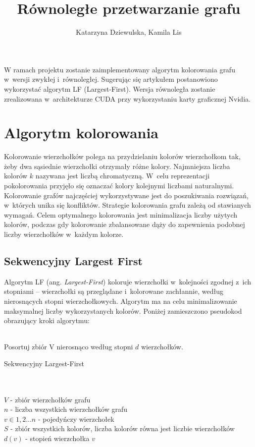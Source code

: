 \documentclass{article}
\date{}
\author{Katarzyna Dziewulska, Kamila Lis}
\title{Równoległe przetwarzanie grafu}
\begin{document}
	\maketitle
	W ramach projektu zostanie zaimplementowany algorytm kolorowania grafu w~wersji zwykłej i~równoległej. Sugerując się artykułem \cite{article} postanowiono wykorzystać algorytm LF (Largest-First). Wersja równoległa zostanie zrealizowana w~architekturze CUDA przy wykorzystaniu karty graficznej Nvidia.\\
	
	\section{Algorytm kolorowania}
	Kolorowanie wierzchołków polega na  przydzielaniu kolorów wierzchołkom tak, żeby dwa sąsiednie wierzchołki otrzymały różne kolory. Najmniejsza liczba kolorów $k$ nazywana jest liczbą chromatyczną. W~celu reprezentacji pokolorowania przyjęło się oznaczać kolory kolejnymi liczbami naturalnymi. Kolorowanie grafów najczęściej wykorzystywane jest do poszukiwania rozwiązań, w~których unika się konfliktów. Strategie kolorowania grafu zależą od stawianych wymagań. Celem optymalnego kolorowania jest minimalizacja liczby użytych kolorów, podczas gdy kolorowanie zbalansowane dąży do zapewnienia podobnej liczby wierzchołków w~każdym kolorze.
	\subsection{Sekwencyjny Largest First}
	Algorytm LF (ang. \textit{Largest-First}) koloruje wierzchołki w~kolejności zgodnej z~ich stopniami -- wierzchołki są przeglądane i~kolorowane zachłannie, według nierosnących stopni wierzchołkowych. Algorytm ma na celu minimalizowanie maksymalnej liczby wykorzystanych kolorów. 	
	Poniżej zamieszczono pseudokod obrazujący kroki algorytmu:
	\\
	\\
	\begin{algorithm}[H]
		\SetAlgoLined
		Posortuj zbiór V nierosnąco według stopni $d$ wierzchołków.
		\\
		\caption{Sekwencyjny Largest-First}
	\end{algorithm}
\
\\
\\
		$V$ - zbiór wierzchołków grafu
		\\
		$n$ - liczba wszystkich wierzchołków grafu
		\\
		$v \in 1,2 ...n$ - pojedyńczy wierzchołek
		\\
		$S$ - zbiór wszystkich kolorów, liczba kolorów równa jest liczbie wierzchołków
		\\
		$d(v)$ - stopień wierzchołka $v$
\end{document}
